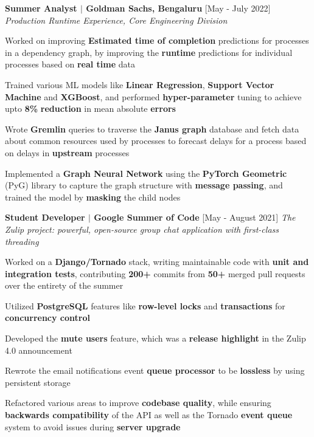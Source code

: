 \documentclass[12pt]{article}
\newcommand{\smallbullet}{
    \small$\bullet$
}
\newcommand{\bigblock}[3]{
    {
        \hspace*{-8pt} \textbf{#1} \hfill #2 \newline
        \textit{#3}
    }
}
\newenvironment{bullet-list-minor}{
    \begin{list}{
        \smallbullet
    }{
        \setlength\leftmargin{30pt}\topsep 0pt \itemsep -3pt
    }
} {
    \end{list}
}
\begin{document}
    \bigblock{
        Summer Analyst \(|\) Goldman Sachs, Bengaluru
    }{
        [May - July 2022]
    }{
        Production Runtime Experience, Core Engineering Division
    }
    \begin{bullet-list-minor}
        \item Worked on improving \textbf{Estimated time of completion} predictions for processes in a
        dependency graph, by improving the \textbf{runtime} predictions for individual processes based
        on \textbf{real time} data
        \item Trained various ML models like \textbf{Linear Regression}, \textbf{Support Vector Machine}
        and \textbf{XGBoost}, and performed \textbf{hyper-parameter} tuning to achieve upto \textbf{8\%}
        \textbf{reduction} in mean absolute \textbf{errors}
        \item Wrote \textbf{Gremlin} queries to traverse the \textbf{Janus graph} database and fetch data about common
        resources used by processes to forecast delays for a process based on delays in \textbf{upstream} processes
        \item Implemented a \textbf{Graph Neural Network} using the \textbf{PyTorch Geometric} (PyG) library
        to capture the graph structure with \textbf{message passing}, and trained the model by \textbf{masking} the
        child nodes
    \end{bullet-list-minor}


    \bigblock{
        Student Developer \(|\) Google Summer of Code
    }{
        [May - August 2021]
    }{
        The Zulip project: powerful, open-source group chat application with first-class threading
    }
    \begin{bullet-list-minor}
        \item Worked on a \textbf{Django/Tornado} stack, writing maintainable code with \textbf{unit and integration tests},
        contributing \textbf{200+} commits from \textbf{50+} merged pull requests over the entirety of the summer
        \item Utilized \textbf{PostgreSQL} features like \textbf{row-level locks} and \textbf{transactions} for \textbf{concurrency control}
        \item Developed the \textbf{mute users} feature, which was a \textbf{release highlight} in the Zulip 4.0 announcement
        \item Rewrote the email notifications event \textbf{queue processor} to be \textbf{lossless} by using persistent storage
        \item Refactored various areas to improve \textbf{codebase quality}, while ensuring \textbf{backwards compatibility}
        of the API as well as the Tornado \textbf{event queue} system to avoid issues during \textbf{server upgrade}
    \end{bullet-list-minor}
\end{document}
